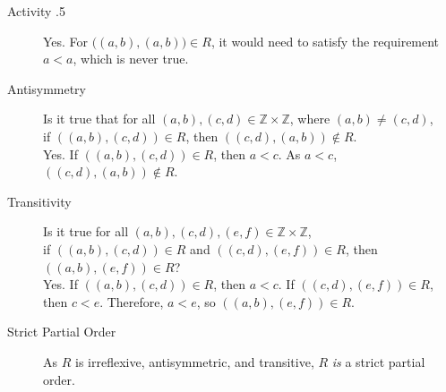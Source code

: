 \documentclass[\main/notes.tex]{subfiles}
\begin{document}
\begin{exercise}{Activity \thechapter.5}
\begin{questions}
\begin{questions}
\begin{answer}
\begin{description}
												Yes. For $\bigl((a, b), (a, b)\bigr) \in R$, it would need to satisfy the requirement $a < a$, which is never true.
											\item[Antisymmetry] Is it true that for all $(a, b), (c, d) \in \mathbb{Z} \times \mathbb{Z}$, where $(a, b) \neq (c, d)$, \\ if $\left((a, b), (c, d)\right) \in R$, then $\left((c, d), (a, b)\right) \notin R$.\\
												Yes. If $\left((a, b), (c, d)\right) \in R$, then $a < c$. As $a < c$, $\left((c, d), (a, b)\right) \notin R$.
											\item[Transitivity] Is it true for all $(a, b), (c, d), (e, f) \in \mathbb{Z} \times \mathbb{Z}$, \\ if $\left((a, b), (c, d)\right) \in R$ and $\left((c, d), (e, f)\right) \in R$, then $\left((a, b), (e, f)\right) \in R$?\\
												Yes. If $\left((a, b), (c, d)\right) \in R$, then $a < c$. If $\left((c, d), (e, f)\right) \in R$, then $c < e$. Therefore, $a < e$, so $\left((a, b), (e, f)\right) \in R$.
											\item[Strict Partial Order] As $R$ is irreflexive, antisymmetric, and transitive, $R$ \emph{is} a strict partial order.
										\end{description}
									\end{answer}
							\end{questions}
					\end{questions}
				\end{exercise}
			\pagebreak
\end{document}

